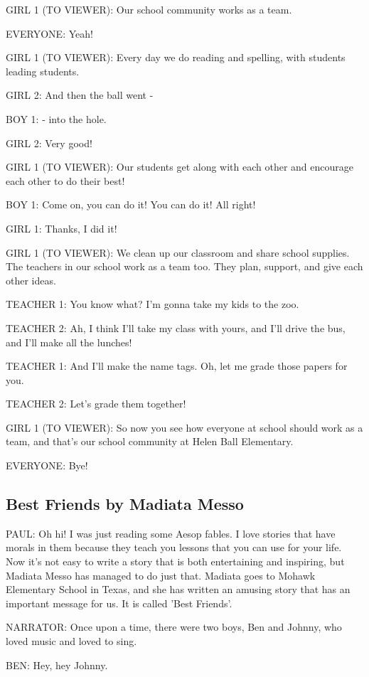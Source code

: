 GIRL 1 (TO VIEWER):
Our school community works as a team.

EVERYONE:
Yeah!

GIRL 1 (TO VIEWER):
Every day we do reading and spelling, with students leading students.

GIRL 2:
And then the ball went -

BOY 1:
- into the hole.

GIRL 2:
Very good!

GIRL 1 (TO VIEWER):
Our students get along with each other and encourage each other to do their best!

BOY 1:
Come on, you can do it!
You can do it!
All right!

GIRL 1:
Thanks, I did it!

GIRL 1 (TO VIEWER):
We clean up our classroom and share school supplies.
The teachers in our school work as a team too.
They plan, support, and give each other ideas.

TEACHER 1:
You know what?
I'm gonna take my kids to the zoo.

TEACHER 2:
Ah, I think I'll take my class with yours, and I'll drive the bus, and I'll make all the lunches!

TEACHER 1:
And I'll make the name tags.
Oh, let me grade those papers for you.

TEACHER 2:
Let's grade them together!

GIRL 1 (TO VIEWER):
So now you see how everyone at school should work as a team, and that's our school community at Helen Ball Elementary.

EVERYONE:
Bye!

\subsection{Best Friends by Madiata Messo}

PAUL:
Oh hi!
I was just reading some Aesop fables.
I love stories that have morals in them because they teach you lessons that you can use for your life.
Now it's not easy to write a story that is both entertaining and inspiring, but Madiata Messo has managed to do just that.
Madiata goes to Mohawk Elementary School in Texas, and she has written an amusing story that has an important message for us.
It is called 'Best Friends'.

NARRATOR:
Once upon a time, there were two boys, Ben and Johnny, who loved music and loved to sing.

BEN:
Hey, hey Johnny.

